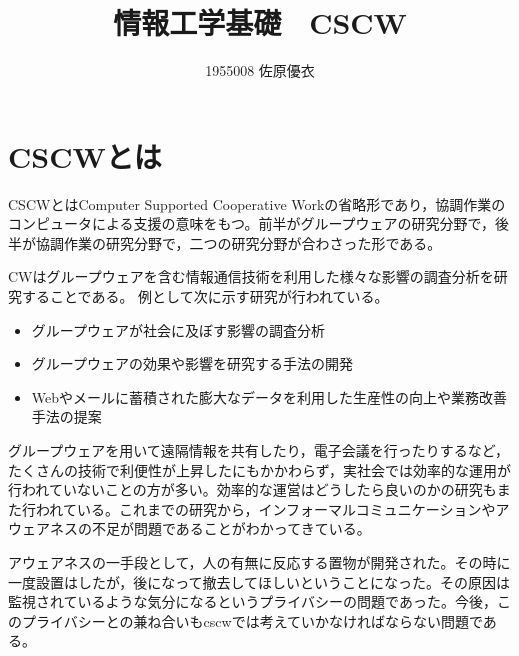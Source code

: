 \documentclass[a4paper]{jsarticle}
\title{情報工学基礎　CSCW}
\author{1955008   	佐原優衣}
\date{}
\begin{document}
\maketitle

\section*{CSCWとは}
CSCWとはComputer Supported Cooperative Workの省略形であり，協調作業のコンピュータによる支援の意味をもつ。前半がグループウェアの研究分野で，後半が協調作業の研究分野で，二つの研究分野が合わさった形である。

CWはグループウェアを含む情報通信技術を利用した様々な影響の調査分析を研究することである。
例として次に示す研究が行われている。
\begin{itemize}
  \item グループウェアが社会に及ぼす影響の調査分析
  \item グループウェアの効果や影響を研究する手法の開発
  \item Webやメールに蓄積された膨大なデータを利用した生産性の向上や業務改善手法の提案
\end{itemize}


グループウェアを用いて遠隔情報を共有したり，電子会議を行ったりするなど，たくさんの技術で利便性が上昇したにもかかわらず，実社会では効率的な運用が行われていないことの方が多い。効率的な運営はどうしたら良いのかの研究もまた行われている。これまでの研究から，インフォーマルコミュニケーションやアウェアネスの不足が問題であることがわかってきている。

アウェアネスの一手段として，人の有無に反応する置物が開発された。その時に一度設置はしたが，後になって撤去してほしいということになった。その原因は監視されているような気分になるというプライバシーの問題であった。今後，このプライバシーとの兼ね合いもcscwでは考えていかなければならない問題である。
\end{document}
